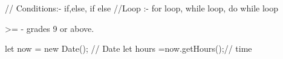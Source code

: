 // Conditions:-  if,else, if else
//Loop :-  for loop, while loop, do while loop

>= - grades 9 or above.

let now = new Date(); // Date 
let hours =now.getHours();// time